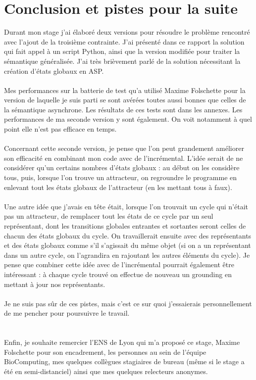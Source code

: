 \documentclass[12pt,a4paper]{article}
\begin{document}
\section{Conclusion et pistes pour la suite}
Durant mon stage j'ai élaboré deux versions pour résoudre le problème rencontré avec l'ajout de la troisième contrainte. J'ai présenté dans ce rapport la solution qui fait appel à un script Python, ainsi que la version modifiée 
pour traiter la sémantique généralisée. J'ai très brièvement parlé de la solution nécessitant la création d'états globaux en ASP.\\ \\
Mes performances sur la batterie de test qu'a utilisé Maxime Folschette pour la version de laquelle je suis parti se sont avérées toutes aussi bonnes que celles de la sémantique asynchrone. Les résultats de ces tests sont dans les 
annexes. Les performances de ma seconde version y sont également. On voit notamment à quel point elle n'est pas efficace en temps.\\ \\
Concernant cette seconde version, je pense que l'on peut grandement améliorer son efficacité en combinant mon code avec de l'incrémental. L'idée serait de ne considérer qu'un certains nombres d'états globaux : au début on les 
considère tous, puis, lorsque l'on trouve un attracteur, on regroundre le programme en enlevant tout les états globaux de l'attracteur (en les mettant tous à faux).\\ \\
Une autre idée que j'avais en tête était, lorsque l'on trouvait un cycle qui n'était pas un attracteur, de remplacer tout les états de ce cycle par un seul représentant, dont les transitions globales entrantes et sortantes 
seront celles de chacun des états globaux du cycle. On travaillerait ensuite avec des représentants et des états globaux comme s'il s'agissait du même objet (si on a un représentant dans un autre cycle, on l'agrandira en rajoutant 
les autres éléments du cycle). Je pense que combiner cette idée avec de l'incrémental pourrait également être intéressant : à chaque cycle trouvé on effectue de nouveau un grounding en mettant à jour nos représentants.\\ \\
Je ne suis pas sûr de ces pistes, mais c'est ce sur quoi j'essaierais personnellement de me pencher pour poursuivre le travail.\\ \\ \\
Enfin, je souhaite remercier l'ENS de Lyon qui m'a proposé ce stage, Maxime Folschette pour son encadrement, les personnes au sein de l'équipe BioComputing, mes quelques collègues stagiaires de bureau (même si le stage a été en 
semi-distanciel) ainsi que mes quelques relecteurs anonymes.

\newpage

\end{document}
